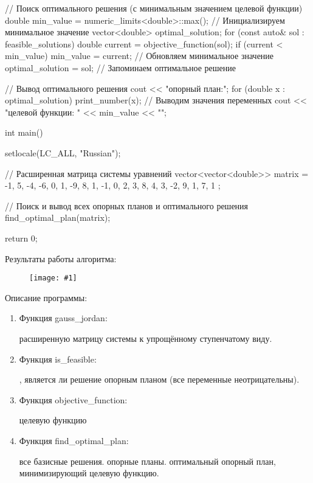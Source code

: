 \documentclass{report}
\newcommand{\drawzalupa}[2]{
	\begin{figure}[H]
		\centering
		\texttt{[image: \#1]}
	\end{figure}
}
\begin{document}
\begin{code}
{			// Поиск оптимального решения (с минимальным значением целевой функции)
			double min_value = numeric_limits<double>::max(); // Инициализируем минимальное значение
			vector<double> optimal_solution;
			for (const auto& sol : feasible_solutions) {
				double current = objective_function(sol); 
				if (current < min_value) {
					min_value = current; // Обновляем минимальное значение
					optimal_solution = sol; // Запоминаем оптимальное решение
				}
			}
			
			// Вывод оптимального решения
			cout << " опорный план:\n";
			for (double x : optimal_solution) {
				print_number(x); // Выводим значения переменных
			}
			cout << " целевой функции: " << min_value << "\n"; 
		}
		
		int main() {
			setlocale(LC_ALL, "Russian"); 
			
			// Расширенная матрица системы уравнений
			vector<vector<double>> matrix = {
				{-1, 5, -4, -6, 0, 1, -9},
				{8, 1, -1, 0, 2, 3, 8},
				{4, 3, -2, 9, 1, 7, 1}
			};
			
			// Поиск и вывод всех опорных планов и оптимального решения
			find_optimal_plan(matrix);
			
			return 0;
		}
	\end{code}
	
	Результаты работы алгоритма:
	
	\drawzalupa{images/task2.png}{1}
	
	\newpage
	
	Описание программы:
	
	\begin{enumerate}
		\item{Функция gauss\_jordan:}
		\begin{itemize}
			 расширенную матрицу системы к упрощённому ступенчатому виду.
		\end{itemize}
		\item{Функция is\_feasible:}
		\begin{itemize}
			, является ли решение опорным планом (все переменные неотрицательны).
		\end{itemize}
		\item{Функция objective\_function:}
		\begin{itemize}
			 целевую функцию
		\end{itemize}
		\item{Функция find\_optimal\_plan:}
		\begin{itemize}
			 все базисные решения.
			 опорные планы.
			 оптимальный опорный план, минимизирующий целевую функцию.
		\end{itemize}
	\end{enumerate}
	
\end{document}
